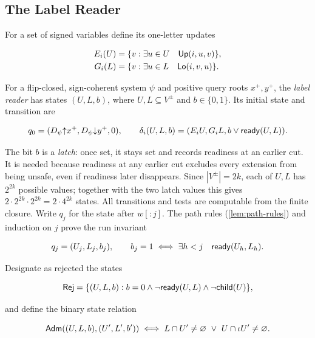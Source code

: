 \subsection{The Label Reader}\label{sec:label-reader}
For a set of signed variables define its one-letter updates

\begin{equation}\label{eq:g37}
\begin{aligned}
 E_i(U)&=\{v:\exists u\in U\quad\mathsf{Up}(i,u,v)\},\\
 G_i(L)&=\{v:\exists u\in L\quad\mathsf{Lo}(i,v,u)\}.
 \end{aligned}
\end{equation}

For a flip-closed, sign-coherent system $\psi$ and positive query roots
$x^+,y^+$, the \emph{label reader} has states $(U,L,b)$, where $U,L\subseteq V^{\pm}$
and $b\in\{0,1\}$. Its initial state and transition are

\begin{equation}\label{eq:g38}
q_0=(D_\psi\mathord\uparrow x^+,D_\psi\mathord\downarrow y^+,0),
 \qquad
 \delta_i(U,L,b)=(E_iU,G_iL,b\lor\mathsf{ready}(U,L)).
\end{equation}

The bit $b$ is a \emph{latch}: once set, it stays set and records readiness
at an earlier cut. It is needed because readiness at any earlier cut
excludes every extension from being unsafe, even if readiness later disappears.
Since $|V^\pm|=2k$, each of $U,L$ has $2^{2k}$ possible values;
together with the two latch values this gives
$2\cdot2^{2k}\cdot2^{2k}=2\cdot4^{2k}$ states.
All transitions and tests are computable
from the finite closure. Write $q_j$ for the state after $w[:j]$.
The path rules (\cref{lem:path-rules}) and induction on $j$ prove the run invariant

\begin{equation}\label{eq:g39}
q_j=(U_j,L_j,b_j),\qquad
 b_j=1\iff\exists h<j\quad\mathsf{ready}(U_h,L_h).
\end{equation}

Designate as rejected the states

\begin{equation}\label{eq:g40}
\mathsf{Rej}=\{(U,L,b):b=0\land\neg\mathsf{ready}(U,L)
                         \land\neg\mathsf{child}(U)\},
\end{equation}

and define the binary state relation

\begin{equation}\label{eq:g41}
\mathsf{Adm}((U,L,b),(U',L',b'))
 \iff L\cap U'\ne\varnothing\ \lor\ U\cap\iota U'\ne\varnothing.
\end{equation}

